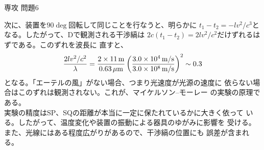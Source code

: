 \documentclass[fleqn]{jbook}
\begin{document}
\begin{answer}{専攻 問題6}{}
\begin{subanswers}
  次に、装置を$90\deg$回転して同じことを行なうと、明らかに
  $t_{1}-t_{2}=-lv^2/c^3$となる。したがって、Dで観測される干渉縞は
  $2c(t_{1}-t_{2})=2lv^2/c^2$だけずれるはずである。このずれを波長に
  直すと、
%
  \[  \frac{2lv^2/c^2}{\lambda}%
    = \frac{2\times 11\Unit{m}}{0.63\Unit{\mu m}}%
      \left( \frac{3.0\Keta{4}\Unit{m/s}}{3.0\Keta{8}\Unit{m/s}}%
      \right)^{2} \sim 0.3 \]
%
  となる。「エーテルの風」がない場合、つまり光速度が光源の速度に
  依らない場合はこのずれは観測されない。これが、マイケルソン--モーレー
  の実験の原理である。\\
%
  実験の精度はSP、SQの距離が本当に一定に保たれているかに大きく依って
  いる。したがって、温度変化や装置の振動による器具のゆがみに影響を
  受ける。また、光線にはある程度広がりがあるので、干渉縞の位置にも
  誤差が含まれる。

\end{subanswers}
\end{answer}
\end{document}
